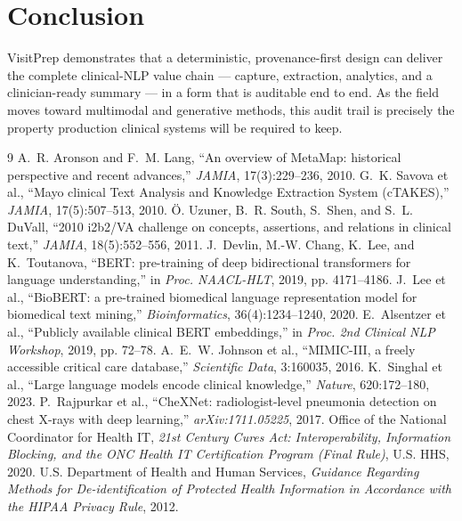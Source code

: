 \documentclass[10pt,twocolumn]{article}
\begin{document}
\section{Conclusion}
VisitPrep demonstrates that a deterministic, provenance-first design can deliver the complete clinical-NLP value chain --- capture, extraction, analytics, and a clinician-ready summary --- in a form that is auditable end to end. As the field moves toward multimodal and generative methods, this audit trail is precisely the property production clinical systems will be required to keep.

\begin{thebibliography}{9}\footnotesize\setlength{\itemsep}{2pt}
 A.~R. Aronson and F.~M. Lang, ``An overview of MetaMap: historical perspective and recent advances,'' \emph{JAMIA}, 17(3):229--236, 2010.
 G.~K. Savova et al., ``Mayo clinical Text Analysis and Knowledge Extraction System (cTAKES),'' \emph{JAMIA}, 17(5):507--513, 2010.
 \"O. Uzuner, B.~R. South, S.~Shen, and S.~L. DuVall, ``2010 i2b2/VA challenge on concepts, assertions, and relations in clinical text,'' \emph{JAMIA}, 18(5):552--556, 2011.
 J.~Devlin, M.-W. Chang, K.~Lee, and K.~Toutanova, ``BERT: pre-training of deep bidirectional transformers for language understanding,'' in \emph{Proc. NAACL-HLT}, 2019, pp. 4171--4186.
 J.~Lee et al., ``BioBERT: a pre-trained biomedical language representation model for biomedical text mining,'' \emph{Bioinformatics}, 36(4):1234--1240, 2020.
 E.~Alsentzer et al., ``Publicly available clinical BERT embeddings,'' in \emph{Proc. 2nd Clinical NLP Workshop}, 2019, pp. 72--78.
 A.~E.~W. Johnson et al., ``MIMIC-III, a freely accessible critical care database,'' \emph{Scientific Data}, 3:160035, 2016.
 K.~Singhal et al., ``Large language models encode clinical knowledge,'' \emph{Nature}, 620:172--180, 2023.
 P.~Rajpurkar et al., ``CheXNet: radiologist-level pneumonia detection on chest X-rays with deep learning,'' \emph{arXiv:1711.05225}, 2017.
 Office of the National Coordinator for Health IT, \emph{21st Century Cures Act: Interoperability, Information Blocking, and the ONC Health IT Certification Program (Final Rule)}, U.S. HHS, 2020.
 U.S. Department of Health and Human Services, \emph{Guidance Regarding Methods for De-identification of Protected Health Information in Accordance with the HIPAA Privacy Rule}, 2012.
\end{thebibliography}
\end{document}
